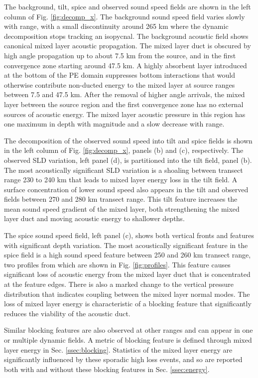 \documentclass[preprint,NumberedRefs]{JASA}
\begin{document}
The background, tilt, spice and observed sound speed fields are shown in the left column of Fig. \ref{fig:decomp_x}. The background sound speed field varies slowly with range, with a small discontinuity around 265 km where the dynamic decomposition stops tracking an isopycnal. The background acoustic field shows canonical mixed layer acoustic propagation. The mixed layer duct is obscured by high angle propagation up to about 7.5 km from the source, and in the first convergence zone starting around 47.5 km. A highly absorbent layer introduced at the bottom of the PE domain suppresses bottom interactions that would otherwise contribute non-ducted energy to the mixed layer at source ranges between 7.5 and 47.5 km. After the removal of higher angle arrivals, the mixed layer between the source region and the first convergence zone has no external sources of acoustic energy. The mixed layer acoustic pressure in this region has one maximum in depth with magnitude and a slow decrease with range.

The decomposition of the observed sound speed into tilt and spice fields is shown in the left column of Fig. \ref{fig:decomp_x}, panels (b) and (c), respectively. The observed SLD variation, left panel (d), is partitioned into the tilt field, panel (b). The most acoustically significant SLD variation is a shoaling between transect range 230 to 240 km that leads to mixed layer energy loss in the tilt field. A surface concentration of lower sound speed also appears in the tilt and observed fields between 270 and 280 km transect range. This tilt feature increases the mean sound speed gradient of the mixed layer, both strengthening the mixed layer duct and moving acoustic energy to shallower depths.

The spice sound speed field, left panel (c), shows both vertical fronts and features with significant depth variation. The most acoustically significant feature in the spice field is a high sound speed feature between 250 and 260 km transect range, two profiles from which are shown in Fig. \ref{fig:profiles}. This feature causes significant loss of acoustic energy from the mixed layer duct that is concentrated at the feature edges. There is also a marked change to the vertical pressure distribution that indicates coupling between the mixed layer normal modes. The loss of mixed layer energy is characteristic of a blocking feature that significantly reduces the viability of the acoustic duct.

Similar blocking features are also observed at other ranges and can appear in one or multiple dynamic fields. A metric of blocking feature is defined through mixed layer energy in Sec. \ref{ssec:blocking}. Statistics of the mixed layer energy are significantly influenced by these sporadic high loss events, and so are reported both with and without these blocking features in Sec. \ref{ssec:energy}.
\end{document}
